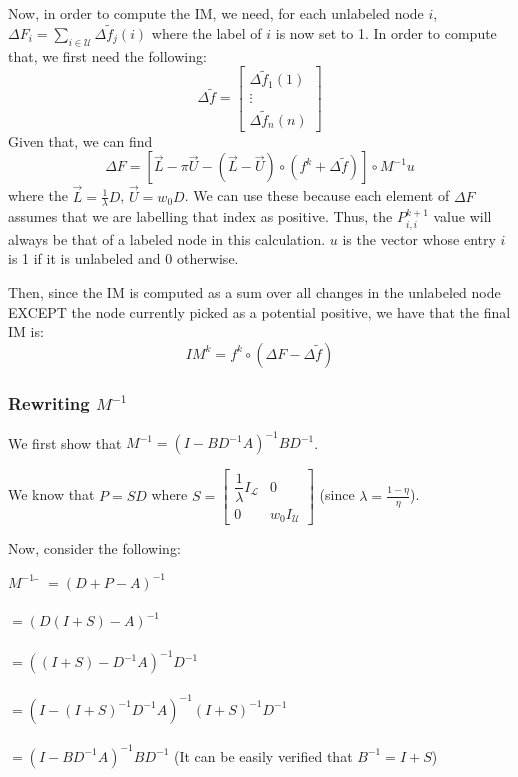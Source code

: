 \documentclass[12pt]{article}
\renewcommand{\L}{\mathcal{L}}
\newcommand{\U}{\mathcal{U}}
\newcommand{\inv}[1]{#1^{-1}}
\begin{document}
			Now, in order to compute the IM, we need, for each unlabeled node $i$,\\ $\Delta F_i = \sum\limits_{i\in \U} \Delta \widetilde{f}_j(i)$ where the label of $i$ is now set to 1. In order to compute that, we first need the following:
			$$\Delta \widetilde{f} = \left[\begin{matrix}\Delta \widetilde{f}_1(1)\\ \vdots \\ \Delta\widetilde{f}_{n}(n)\end{matrix}\right]$$
			Given that, we can find 
			\begin{equation}
				\Delta F = \left[\overrightarrow{L} - \pi\overrightarrow{U} - (\overrightarrow{L}-\overrightarrow{U})\circ(f^k + \Delta \widetilde{f})\right] \circ \inv{M} u
			\end{equation}
			where the $\overrightarrow{L} = \frac{1}{\lambda}D$, $\overrightarrow{U} = w_0 D$. We can use these because each element of $\Delta F$ assumes that we are labelling that index as positive. Thus, the $P_{i,i}^{k+1}$ value will always be that of a labeled node in this  calculation. $u$ is the vector whose entry $i$ is 1 if it is unlabeled and 0 otherwise.

			Then, since the IM is computed as a sum over all changes in the unlabeled node EXCEPT the node currently picked as a potential positive, we have that the final IM is:
			\begin{equation}
				IM^k = f^k \circ (\Delta F - \Delta \widetilde{f})
			\end{equation}

		\subsubsection{Rewriting $\inv{M}$}
			We first show that $\inv{M} = \inv{(I - B\inv{D}A)}B\inv{D}$.

			We know that $P=SD$ where 
			$S = \left[\begin{matrix}\dfrac{1}{\lambda} I_\L&0 \\ 0&w_0 I_\U\end{matrix}\right]$ (since $\lambda = \frac{1-\eta}{\eta}$).

			Now, consider the following:
			\begin{tabbing}
				$\inv{M}$ \= $= \inv{(D + P - A)}$\\\\
				\>$=\inv{(D(I+S)-A)}$\\\\
				\>$=\inv{((I+S)-\inv{D}A)}\inv{D}$\\\\
				\>$=\inv{(I-\inv{(I+S)}\inv{D}A)}\inv{(I+S)}\inv{D}$\\\\
				\>$=\inv{(I-B\inv{D}A)}B\inv{D}$ \hspace{5mm}(It can be easily verified that $\inv{B} = I+S$)
			\end{tabbing}
\end{document}
